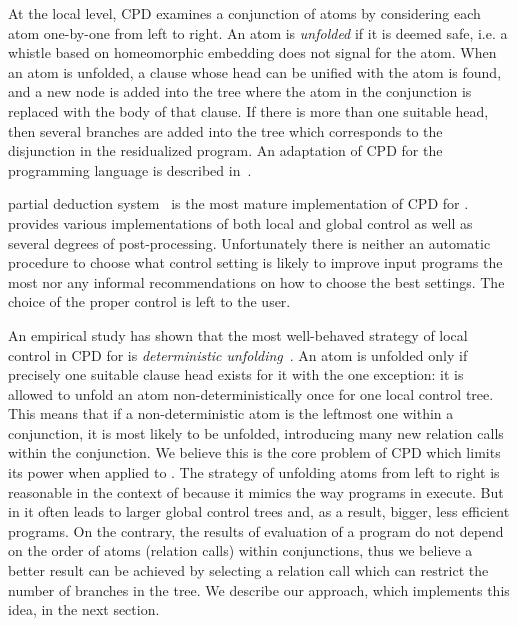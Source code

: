 At the local level, CPD examines a conjunction of atoms by considering each atom one-by-one from left to right.
An atom is \emph{unfolded} if it is deemed safe, i.e. a whistle based on homeomorphic embedding does not signal for the atom.
When an atom is unfolded, a clause whose head can be unified with the atom is found, and a new node is added into the tree where the atom in the conjunction is replaced with the body of that clause.
If there is more than one suitable head, then several branches are added into the tree which corresponds to the disjunction in the residualized program.
An adaptation of CPD for the \mk programming language is described in~\cite{lozov2019relational}.

\ecce partial deduction system~\cite{leuschel1997ecce} is the most mature implementation of CPD for \pro.
\ecce provides various implementations of both local and global control as well as several degrees of post-processing.
Unfortunately there is neither an automatic procedure to choose what control setting is likely to improve input programs the most nor any informal recommendations on how to choose the best settings.
The choice of the proper control is left to the user.

An empirical study has shown that the most well-behaved strategy of local control in CPD for \pro is \emph{deterministic unfolding}~\cite{leuschel1997advanced}.
An atom is unfolded only if precisely one suitable clause head exists for it with the one exception: it is allowed to unfold an atom non-deterministically once for one local control tree.
This means that if a non-deterministic atom is the leftmost one within a conjunction, it is most likely to be unfolded, introducing many new relation calls within the conjunction.
We believe this is the core problem of CPD which limits its power when applied to \mk.
The strategy of unfolding atoms from left to right is reasonable in the context of \pro because it mimics the way programs in \pro execute.
But in \mk it often leads to larger global control trees and, as a result, bigger, less efficient programs.
On the contrary, the results of evaluation of a \mk program do not depend on the order of atoms (relation calls) within conjunctions, thus we believe a better result can be achieved by selecting a relation call which can restrict the number of branches in the tree.
We describe our approach, which implements this idea, in the next section.
